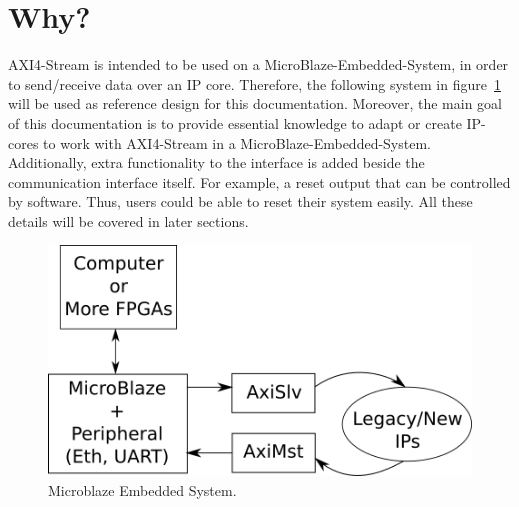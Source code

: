\section{Why?}

AXI4-Stream is intended to be used on a MicroBlaze-Embedded-System, in order to send/receive data over an IP core. Therefore, the following system in figure~\ref{f0} will be used as reference  design for this documentation. Moreover, the main goal of this documentation is to provide essential knowledge to adapt or create IP-cores to work with AXI4-Stream in a MicroBlaze-Embedded-System. Additionally, extra functionality to the interface is added beside the communication interface itself. For example, a reset output that can be controlled by software. Thus, users could be able to reset their system easily. All these details will be covered in later sections.

\begin{figure}[!h]
\includegraphics[scale=0.35]{images/idea.png}
\caption{Microblaze Embedded System.}
\label{f0}
\end{figure}

